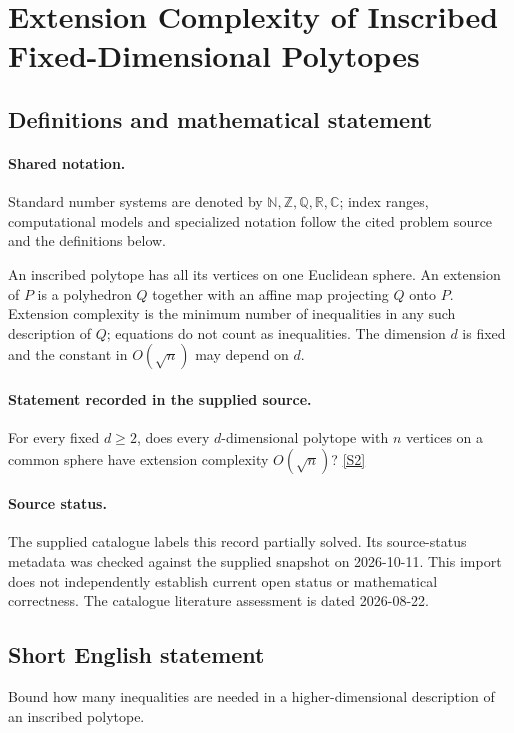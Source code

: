 \documentclass[11pt]{article}
\newcommand{\sref}[2]{\hyperlink{source:#1:#2}{[S#2]}}
\begin{document}
\section{Extension Complexity of Inscribed Fixed-Dimensional Polytopes}\label{statement}

\subsection{Definitions and mathematical statement}

\paragraph{Shared notation.}Standard number systems are denoted by $\mathbb N,\mathbb Z,\mathbb Q,\mathbb R,\mathbb C$; index ranges, computational models and specialized notation follow the cited problem source and the definitions below.


An inscribed polytope has all its vertices on one Euclidean sphere. An extension of $P$ is a polyhedron $Q$ together with an affine map projecting $Q$ onto $P$. Extension complexity is the minimum number of inequalities in any such description of $Q$; equations do not count as inequalities. The dimension $d$ is fixed and the constant in $O(\sqrt n)$ may depend on $d$.
\paragraph{Statement recorded in the supplied source.}
For every fixed $d\geq2$, does every $d$-dimensional polytope with $n$ vertices on a common sphere have extension complexity $O(\sqrt n)$? \sref{statement}{2}
\paragraph{Source status.}
The supplied catalogue labels this record partially solved. Its source-status metadata was checked against the supplied snapshot on 2026-10-11. This import does not independently establish current open status or mathematical correctness. The catalogue literature assessment is dated 2026-08-22.
\subsection{Short English statement}
Bound how many inequalities are needed in a higher-dimensional description of an inscribed polytope.
\end{document}
